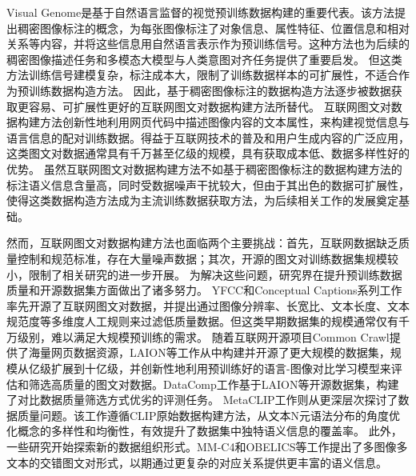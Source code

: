 Visual Genome\cite{krishna2017visual}是基于自然语言监督的视觉预训练数据构建的重要代表。该方法提出稠密图像标注的概念，为每张图像标注了对象信息、属性特征、位置信息和相对关系等内容，并将这些信息用自然语言表示作为预训练信号。这种方法也为后续的稠密图像描述任务和多模态大模型与人类意图对齐任务提供了重要启发\cite{imageinwords,flexcap,densecap}。
但这类方法训练信号建模复杂，标注成本大，限制了训练数据样本的可扩展性，不适合作为预训练数据构造方法。
因此，基于稠密图像标注的数据构造方法逐步被数据获取更容易、可扩展性更好的互联网图文对数据构建方法\cite{YFCC100M, sharma-etal-2018-conceptual, changpinyo2021conceptual}所替代。
互联网图文对数据构建方法创新性地利用网页代码中描述图像内容的文本属性，来构建视觉信息与语言信息的配对训练数据。得益于互联网技术的普及和用户生成内容的广泛应用，这类图文对数据通常具有千万甚至亿级的规模，具有获取成本低、数据多样性好的优势。
虽然互联网图文对数据构建方法不如基于稠密图像标注的数据构建方法的标注语义信息含量高，同时受数据噪声干扰较大，但由于其出色的数据可扩展性，使得这类数据构造方法成为主流训练数据获取方法，为后续相关工作的发展奠定基础。

然而，互联网图文对数据构建方法也面临两个主要挑战：首先，互联网数据缺乏质量控制和规范标准，存在大量噪声数据；其次，开源的图文对训练数据集规模较小，限制了相关研究的进一步开展。
为解决这些问题，研究界在提升预训练数据质量和开源数据集方面做出了诸多努力。
YFCC\cite{YFCC100M}和Conceptual Captions系列\cite{sharma-etal-2018-conceptual,changpinyo2021conceptual}工作率先开源了互联网图文对数据，并提出通过图像分辨率、长宽比、文本长度、文本规范度等多维度人工规则来过滤低质量数据。但这类早期数据集的规模通常仅有千万级别，难以满足大规模预训练的需求。
随着互联网开源项目Common Crawl\cite{cc}提供了海量网页数据资源，LAION等工作\cite{schuhmann2021laion400m,schuhmann2022laion5bopenlargescaledataset,COYO-700m}从中构建并开源了更大规模的数据集，规模从亿级扩展到十亿级，并创新性地利用预训练好的语言-图像对比学习模型来评估和筛选高质量的图文对数据。DataComp\cite{datacomp}工作基于LAION等开源数据集，构建了对比数据质量筛选方式优劣的评测任务。
MetaCLIP\cite{xu2024demystifying}工作则从更深层次探讨了数据质量问题。该工作遵循CLIP原始数据\cite{radford2021learning}构建方法，从文本N元语法分布的角度优化概念的多样性和均衡性，有效提升了数据集中独特语义信息的覆盖率。
此外，一些研究开始探索新的数据组织形式。MM-C4和OBELICS等工作\cite{MM-C4,OBELICS}提出了多图像多文本的交错图文对形式，以期通过更复杂的对应关系提供更丰富的语义信息。

